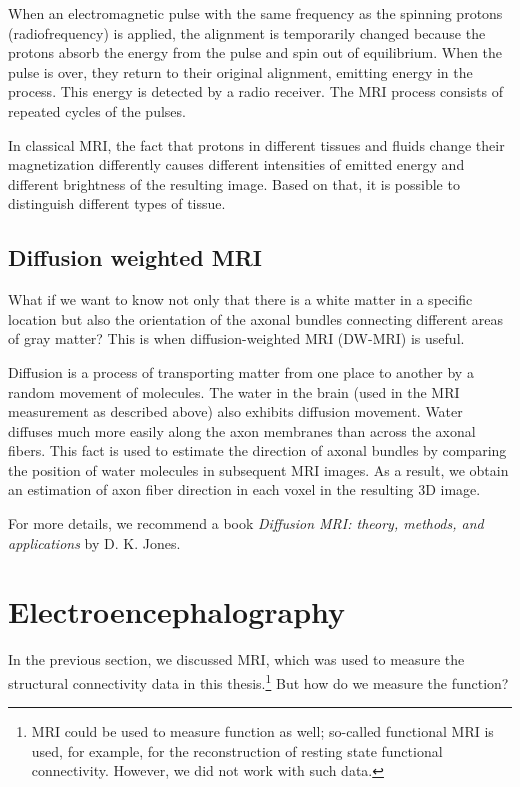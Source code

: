 When an electromagnetic pulse with the same frequency as the spinning protons (radiofrequency) is applied, the alignment is temporarily changed because the protons absorb the energy from the pulse and spin out of equilibrium. When the pulse is over, they return to their original alignment, emitting energy in the process. This energy is detected by a radio receiver. The MRI process consists of repeated cycles of the pulses.\cite{bear_neuroscience_2016,cizkova_comparing_2022}

In classical MRI, the fact that protons in different tissues and fluids change their magnetization differently causes different intensities of emitted energy and different brightness of the resulting image. Based on that, it is possible to distinguish different types of tissue. \cite{bear_neuroscience_2016,cizkova_comparing_2022}

\subsection{Diffusion weighted MRI}

What if we want to know not only that there is a white matter in a specific location but also the orientation of the axonal bundles connecting different areas of gray matter? This is when diffusion-weighted MRI (DW-MRI) is useful.

Diffusion is a process of transporting matter from one place to another by a random movement of molecules. The water in the brain (used in the MRI measurement as described above) also exhibits diffusion movement. Water diffuses much more easily along the axon membranes than across the axonal fibers. This fact is used to estimate the direction of axonal bundles by comparing the position of water molecules in subsequent MRI images. As a result, we obtain an estimation of axon fiber direction in each voxel in the resulting 3D image. \cite{bear_neuroscience_2016,jones_diffusion_2011,calamante_seven_2019}

For more details, we recommend a book \textit{Diffusion MRI: theory, methods, and applications} by D. K. Jones. \cite{jones_diffusion_2011}

\section{Electroencephalography}

In the previous section, we discussed MRI, which was used to measure the structural connectivity data in this thesis.\footnote{MRI could be used to measure function as well; so-called functional MRI is used, for example, for the reconstruction of resting state functional connectivity. However, we did not work with such data.} But how do we measure the function?

